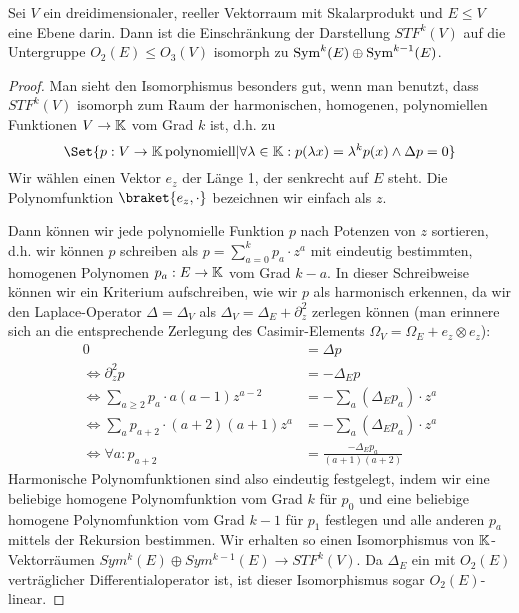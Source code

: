 
\begin{lemma}
Sei $V$ ein dreidimensionaler, reeller Vektorraum mit Skalarprodukt und $E\leq V$ eine Ebene darin. Dann ist die Einschränkung der Darstellung $STF^k(V)$ auf die Untergruppe $O_2(E) \leq O_3(V)$ isomorph zu $\operatorname{Sym}^k(E) \oplus \operatorname{Sym}^{k-1}(E)$.
\end{lemma}
\begin{proof}
Man sieht den Isomorphismus besonders gut, wenn man benutzt, dass $STF^k(V)$ isomorph zum Raum der harmonischen, homogenen, polynomiellen Funktionen $V\to\mathbb{K}$ vom Grad $k$ ist, d.h. zu
\[\Set{p: V\to\IK \,\text{polynomiell} | \forall\lambda\in\IK: p(\lambda x) = \lambda^k p(x) \wedge \Delta p = 0}\]
Wir wählen einen Vektor $e_z$ der Länge 1, der senkrecht auf $E$ steht. Die Polynomfunktion $\braket{e_z,\cdot}$ bezeichnen wir einfach als $z$.

Dann können wir jede polynomielle Funktion $p$ nach Potenzen von $z$ sortieren, d.h. wir können $p$ schreiben als $p = \sum_{a=0}^k p_a \cdot z^a$ mit eindeutig bestimmten, homogenen Polynomen $p_a: E\to\mathbb{K}$ vom Grad $k-a$. In dieser Schreibweise können wir ein Kriterium aufschreiben, wie wir $p$ als harmonisch erkennen, da wir den Laplace-Operator $\Delta=\Delta_V$ als $\Delta_V = \Delta_E + \partial_z^2$ zerlegen können (man erinnere sich an die entsprechende Zerlegung des Casimir-Elements $\Omega_V=\Omega_E + e_z\otimes e_z$):
\begin{align*}
0 &= \Delta p \\
\iff \partial_z^2 p &= -\Delta_ E p \\
\iff \sum_{a\geq 2} p_a \cdot a(a-1)z^{a-2} &= -\sum_a (\Delta_E p_a)\cdot z^a \\
\iff \sum_a p_{a+2}\cdot  (a+2)(a+1)z^a &= -\sum_a (\Delta_E p_a)\cdot z^a \\
\iff \forall a: p_{a+2} &= \frac{-\Delta_E p_a}{(a+1)(a+2)}
\end{align*}
Harmonische Polynomfunktionen sind also eindeutig festgelegt, indem wir eine beliebige homogene Polynomfunktion vom Grad $k$ für $p_0$ und eine beliebige homogene Polynomfunktion vom Grad $k-1$ für $p_1$ festlegen und alle anderen $p_a$ mittels der Rekursion bestimmen. Wir erhalten so einen Isomorphismus von $\mathbb{K}$-Vektorräumen $Sym^k(E) \oplus Sym^{k-1}(E) \to STF^k(V)$. Da $\Delta_E$ ein mit $O_2(E)$ verträglicher Differentialoperator ist, ist dieser Isomorphismus sogar $O_2(E)$-linear.
\end{proof}

